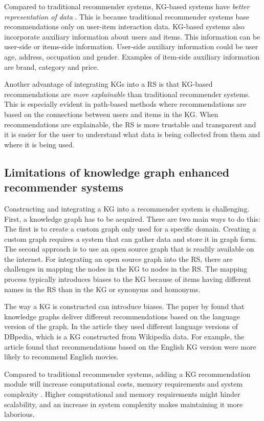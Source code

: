 \documentclass[english, 12pt, a4paper, sci, utf8, a-2b, online]{aaltothesis}
\begin{document}
Compared to traditional recommender systems, KG-based systems have \textit{better representation of data} \parencite{jetti2025knowledge}. This is because traditional recommender systems base recommendations only on user-item interaction data. KG-based systems also incorporate auxiliary information about users and items. This information can be user-side or items-side information. User-side auxiliary information could be user age, address, occupation and gender. Examples of item-side auxiliary information are brand, category and price. 

Another advantage of integrating KGs into a RS is that KG-based recommendations are \textit{more explainable} than traditional recommender systems. This is especially evident in path-based methods where recommendations are based on the connections between users and items in the KG. When recommendations are explainable, the RS is more trustable and transparent and it is easier for the user to understand what data is being collected from them and where it is being used.

\subsection{Limitations of knowledge graph enhanced recommender systems}

Constructing and integrating a KG into a recommender system is challenging. First, a knowledge graph has to be acquired. There are two main ways to do this: The first is to create a custom graph only used for a specific domain. Creating a custom graph requires a system that can gather data and store it in graph form. The second approach is to use an open source graph that is readily available on the internet. For integrating an open source graph into the RS, there are challenges in mapping the nodes in the KG to nodes in the RS. The mapping process typically introduces biases to the KG because of items having different names in the RS than in the KG or synonyms and homonyms.

The way a KG is constructed can introduce biases. The paper by \textcite{voit2021biasknowledgegraphs} found that knowledge graphs deliver different recommendations based on the language version of the graph. In the article they used different language versions of DBpedia, which is a KG constructed from Wikipedia data. For example, the article found that recommendations based on the English KG version were more likely to recommend English movies. 

Compared to traditional recommender systems, adding a KG recommendation module will increase computational costs, memory requirements and system complexity \parencite{jetti2025knowledge}. Higher computational and memory requirements might hinder scalability, and an increase in system complexity makes maintaining it more laborious. 
\end{document}
